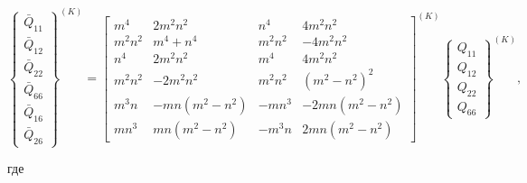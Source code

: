 \begin{equation}

\label{bitkina:eq3}

\left\{ \begin{array}{c}

\bar Q_{11}  \\

\bar Q _{12}\\

\bar Q _{22} \\

\bar Q _{66}  \\

\bar Q _{16}\\

\bar Q _{26}

\end{array}\right\}^{(K)}{\!\!\!\!\!\!\!=} \begin{bmatrix}

m^4 & 2m^2n^2   & n^4   & 4m^2n^2   \\

m^2n^2   & m^4+n^4   & m^2n^2   & -4m^2n^2   \\

n^4   & 2m^2n^2   & m^4   & 4m^2n^2   \\

m^2n^2   & -2m^2n^2   & m^2n^2   & (m^2-n^2)^2  \\

m^3n   & -mn(m^2-n^2)   & -mn^3   & -2mn(m^2-n^2)  \\

mn^3   & mn(m^2-n^2)   & -m^3n   & 2mn(m^2-n^2)

\end{bmatrix}^{(K)}\!\!\!\!\!\!\!\!

\left\{ \begin{array}{c}

Q_{11}   \\

Q_{12}   \\

Q_{22}   \\

Q_{66}  \end{array}\right\}^{(K)},

\end{equation}

где

